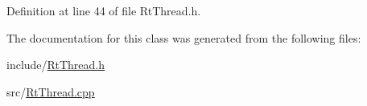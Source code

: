 \-Definition at line 44 of file \-Rt\-Thread.\-h.



\-The documentation for this class was generated from the following files\-:\begin{DoxyCompactItemize}
\item 
include/\hyperlink{_rt_thread_8h}{\-Rt\-Thread.\-h}\item 
src/\hyperlink{_rt_thread_8cpp}{\-Rt\-Thread.\-cpp}\end{DoxyCompactItemize}
